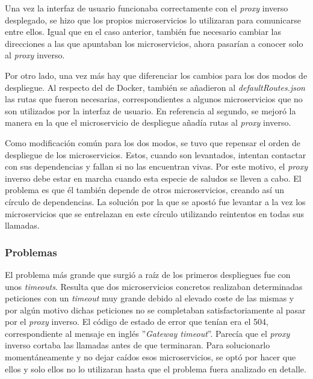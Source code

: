 \documentclass[11pt,spanish,listoffigures]{tfgetsinf}
\begin{document}
Una vez la interfaz de usuario funcionaba correctamente con el \emph{proxy} inverso desplegado, se hizo que los propios microservicios lo utilizaran para comunicarse entre ellos. Igual que en el caso anterior, también fue necesario cambiar las direcciones a las que apuntaban los microservicios, ahora pasarían a conocer solo al \emph{proxy} inverso.

Por otro lado, una vez más hay que diferenciar los cambios para los dos modos de despliegue. Al respecto del de Docker, también se añadieron al \emph{defaultRoutes.json} las rutas que fueron necesarias, correspondientes a algunos microservicios que no son utilizados por la interfaz de usuario. En referencia al segundo, se mejoró la manera en la que el microservicio de despliegue añadía rutas al \emph{proxy} inverso.

Como modificación común para los dos modos, se tuvo que repensar el orden de despliegue de los microservicios. Estos, cuando son levantados, intentan contactar con sus dependencias y fallan si no las encuentran vivas. Por este motivo, el \emph{proxy} inverso debe estar en marcha cuando esta especie de saludos se lleven a cabo. El problema es que él también depende de otros microservicios, creando así un círculo de dependencias. La solución por la que se apostó fue levantar a la vez los microservicios que se entrelazan en este círculo utilizando reintentos en todas sus llamadas.


			\subsubsection{Problemas}

El problema más grande que surgió a raíz de los primeros despliegues fue con unos \emph{timeouts}. Resulta que dos microservicios concretos realizaban determinadas peticiones con un \emph{timeout} muy grande debido al elevado coste de las mismas y por algún motivo dichas peticiones no se completaban satisfactoriamente al pasar por el \emph{proxy} inverso. El código de estado de error que tenían era el 504, correspondiente al mensaje en inglés ''\emph{Gateway timeout}''. Parecía que el \emph{proxy} inverso cortaba las llamadas antes de que terminaran. Para solucionarlo momentáneamente y no dejar caídos esos microservicios, se optó por hacer que ellos y solo ellos no lo utilizaran hasta que el problema fuera analizado en detalle.
\end{document}
